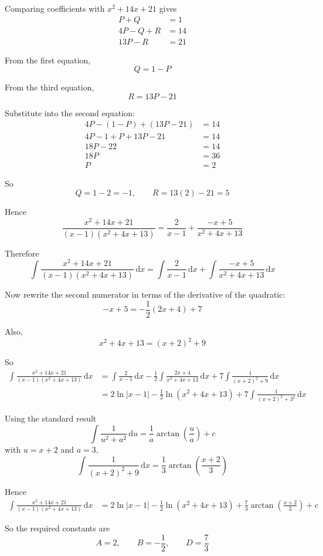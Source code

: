 \documentclass[leqno]{article}
\begin{document}
\begin{enumerate}[
  label=\textbf{\arabic*.},
  leftmargin=*,
  topsep=0pt,
  partopsep=0pt,
  parsep=0pt
]
\begin{tcolorbox}[colback=white, colframe=scarlet, title={\textbf{Solution}}, breakable, grow to left by=6mm, grow to right by=10mm]
Comparing coefficients with $x^2+14x+21$ gives
\begin{align*}
P+Q&=1 \\
4P-Q+R&=14 \\
13P-R&=21
\end{align*}

From the first equation,
\[
Q=1-P
\]

From the third equation,
\[
R=13P-21
\]

Substitute into the second equation:
\begin{align*}
4P-(1-P)+(13P-21)&=14 \\
4P-1+P+13P-21&=14 \\
18P-22&=14 \\
18P&=36 \\
P&=2
\end{align*}

So
\[
Q=1-2=-1,\qquad R=13(2)-21=5
\]

Hence
\[
\frac{x^2+14x+21}{(x-1)(x^2+4x+13)}
=\frac{2}{x-1}+\frac{-x+5}{x^2+4x+13}
\]

Therefore
\[
\int \frac{x^2+14x+21}{(x-1)(x^2+4x+13)}\,\mathrm{d}x
=\int \frac{2}{x-1}\,\mathrm{d}x+\int \frac{-x+5}{x^2+4x+13}\,\mathrm{d}x
\]

Now rewrite the second numerator in terms of the derivative of the quadratic:
\[
-x+5=-\frac12(2x+4)+7
\]

Also,
\[
x^2+4x+13=(x+2)^2+9
\]

So
\begin{align*}
\int \frac{x^2+14x+21}{(x-1)(x^2+4x+13)}\,\mathrm{d}x
&=\int \frac{2}{x-1}\,\mathrm{d}x
-\frac12\int \frac{2x+4}{x^2+4x+13}\,\mathrm{d}x
+7\int \frac{1}{(x+2)^2+9}\,\mathrm{d}x \\
&=2\ln|x-1|-\frac12\ln(x^2+4x+13)+7\int \frac{1}{(x+2)^2+3^2}\,\mathrm{d}x
\end{align*}

Using the standard result
\[
\int \frac{1}{u^2+a^2}\,\mathrm{d}u=\frac{1}{a}\arctan\!\left(\frac{u}{a}\right)+c
\]
with $u=x+2$ and $a=3$,
\[
\int \frac{1}{(x+2)^2+9}\,\mathrm{d}x
=\frac13\arctan\!\left(\frac{x+2}{3}\right)
\]

Hence
\begin{align*}
\int \frac{x^2+14x+21}{(x-1)(x^2+4x+13)}\,\mathrm{d}x
&=2\ln|x-1|-\frac12\ln(x^2+4x+13)+\frac73\arctan\!\left(\frac{x+2}{3}\right)+c
\end{align*}

So the required constants are
\[
A=2,\qquad B=-\frac12,\qquad D=\frac73
\]
\end{tcolorbox}



\end{enumerate}
\end{document}
